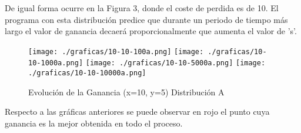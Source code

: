 \documentclass{article}
\begin{document}
  	De igual forma ocurre en la Figura 3, donde el coste de perdida es de 10. El programa con esta distribución predice que durante un periodo de tiempo más largo el valor de ganancia decaerá proporcionalmente que aumenta el valor de 's'.
	
	
	\begin{figure}[h]
		\centering
		\texttt{[image: ./graficas/10-10-100a.png]}
		\texttt{[image: ./graficas/10-10-1000a.png]}
		\texttt{[image: ./graficas/10-10-5000a.png]}
		\texttt{[image: ./graficas/10-10-10000a.png]}
		\caption{Evolución de la Ganancia (x=10, y=5) Distribución A}
	\end{figure}
	
	\newpage
	
	Respecto a las gráficas anteriores se puede observar en rojo el punto cuya ganancia es la mejor obtenida en todo el proceso.
	
\end{document}

